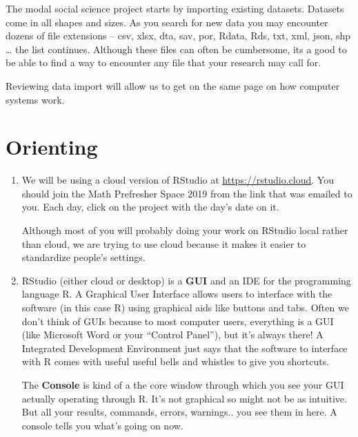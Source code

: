 \documentclass[]{book}
\theoremstyle{definition}
\theoremstyle{definition}
\theoremstyle{definition}
\theoremstyle{remark}
\begin{document}
The modal social science project starts by importing existing datasets. Datasets come in all shapes and sizes. As you search for new data you may encounter dozens of file extensions -- csv, xlsx, dta, sav, por, Rdata, Rds, txt, xml, json, shp \ldots{} the list continues. Although these files can often be cumbersome, its a good to be able to find a way to encounter any file that your research may call for.

Reviewing data import will allow us to get on the same page on how computer systems work.

\hypertarget{orienting}{%
\section{Orienting}\label{orienting}}

\begin{enumerate}
\def\labelenumi{\arabic{enumi}.}
\item
  We will be using a cloud version of RStudio at \url{https://rstudio.cloud}. You should join the Math Prefresher Space 2019 from the link that was emailed to you. Each day, click on the project with the day's date on it.

  Although most of you will probably doing your work on RStudio local rather than cloud, we are trying to use cloud because it makes it easier to standardize people's settings.
\item
  RStudio (either cloud or desktop) is a \textbf{GUI} and an IDE for the programming language R. A Graphical User Interface allows users to interface with the software (in this case R) using graphical aids like buttons and tabs. Often we don't think of GUIs because to most computer users, everything is a GUI (like Microsoft Word or your ``Control Panel''), but it's always there! A Integrated Development Environment just says that the software to interface with R comes with useful useful bells and whistles to give you shortcuts.

  The \textbf{Console} is kind of a the core window through which you see your GUI actually operating through R. It's not graphical so might not be as intuitive. But all your results, commands, errors, warnings.. you see them in here. A console tells you what's going on now.
\end{enumerate}
\end{document}

